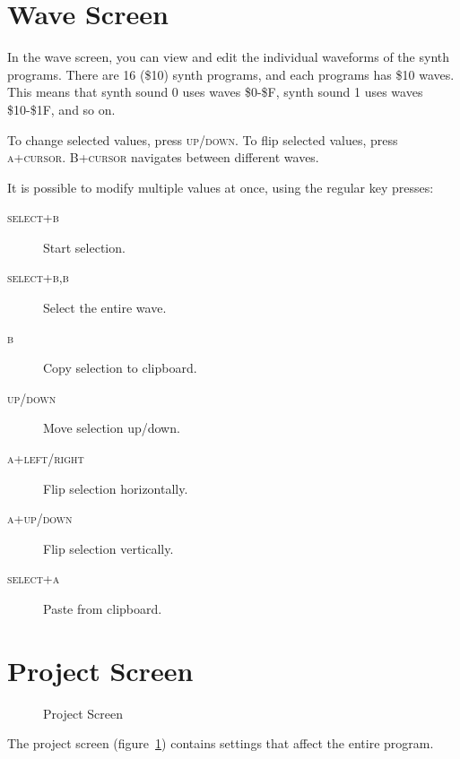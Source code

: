 \section{Wave Screen}
\label{wave-screen-section}

In the wave screen, you can view and edit the individual waveforms of the synth programs. There are 16 (\$10) synth programs, and each programs has \$10 waves. This means that synth sound 0 uses waves \$0-\$F, synth sound 1 uses waves \$10-\$1F, and so on.

To change selected values, press \textsc{up/down}. To flip selected values, press \textsc{a+cursor}. \textsc{B+cursor} navigates between different waves.

It is possible to modify multiple values at once, using the regular key presses:

\begin{description}
	\item[\textsc{select+b}] Start selection.
	\item[\textsc{select+b,b}] Select the entire wave.
	\item[\textsc{b}] Copy selection to clipboard.
	\item[\textsc{up/down}] Move selection up/down.
	\item[\textsc{a+left/right}] Flip selection horizontally.
	\item[\textsc{a+up/down}] Flip selection vertically.
	\item[\textsc{select+a}] Paste from clipboard.
\end{description}

\section{Project Screen}

\begin{figure}[htpb]
	\begin{center}
	\end{center}
	\caption{Project Screen}
	\label{fig:project}
\end{figure}

The project screen (figure~\ref{fig:project}) contains settings that affect the entire program.

